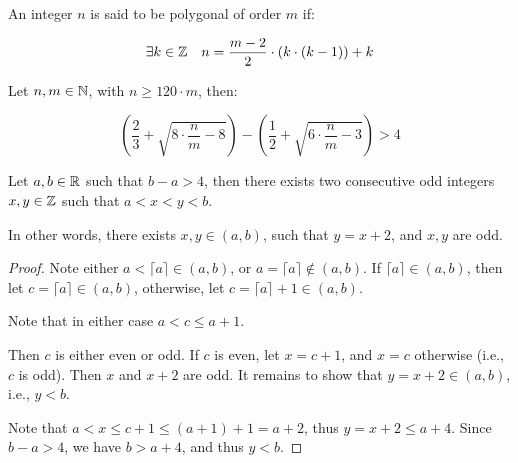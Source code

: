 %

\begin{definition}
    \label{def:Polygonal}
    An integer $n$ is said to be polygonal of order $m$ if:

    \[
        \exists k \in \mathbb{Z} \quad n = \frac{m-2}{2}\cdot (k \cdot (k-1)) + k
    \]
\end{definition}

\begin{lemma}
    \label{lem:IntervalLength}
    \uses{}

    Let $n, m\in \mathbb{N}$, with $n\geq 120 \cdot m$, then:

    \[
        \left(\frac{2}{3} + \sqrt{8 \cdot \frac{n}{m} - 8}\right) - \left(\frac{1}{2} + \sqrt{6 \cdot \frac{n}{m} - 3}\right) > 4
    \]
\end{lemma}

\begin{lemma}
    \label{lem:ExistsOddPair}
    \leanok

    Let $a,b\in \mathbb{R}$ such that $b - a > 4$, then there exists two consecutive odd integers $x,y\in \mathbb{Z}$ such that $a < x < y < b$.

    In other words, there exists $x,y\in (a,b)$, such that $y=x+2$, and $x,y$ are odd.
\end{lemma}

\begin{proof}
    \leanok
    Note either $a<\lceil{a}\rceil\in (a,b)$, or $a=\lceil{a}\rceil\notin (a,b)$. If $\lceil{a}\rceil\in (a,b)$, then let $c=\lceil{a}\rceil\in (a,b)$, otherwise, let $c=\lceil{a}\rceil+1\in (a,b)$.

    Note that in either case $a<c \leq a + 1$.

    Then $c$ is either even or odd. If $c$ is even, let $x=c+1$, and $x=c$ otherwise (i.e., $c$ is odd). Then $x$ and $x+2$ are odd. It remains to show that $y=x+2\in (a,b)$, i.e., $y < b$.

    Note that $a<x\leq c + 1\leq (a + 1) + 1= a + 2$, thus $y=x+2\leq a + 4$. Since $b - a > 4$, we have $b > a + 4$, and thus $y < b$.
\end{proof}

